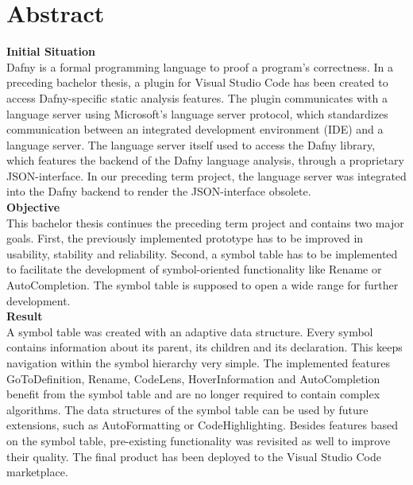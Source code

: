 \section{Abstract}
\label{section:abstract}

\textbf{Initial Situation}\\
Dafny is a formal programming language to proof a program's correctness.
In a preceding bachelor thesis, a plugin for Visual Studio Code has been created to access Dafny-specific static analysis features.
The plugin communicates with a language server using Microsoft's language server protocol, which standardizes communication between an integrated development environment (IDE) and a language server.
The language server itself used to access the Dafny library, which features the backend of the Dafny language analysis, through a proprietary JSON-interface.
In our preceding term project, the language server was integrated into the Dafny backend to render the JSON-interface obsolete.\\

\textbf{Objective}\\
This bachelor thesis continues the preceding term project and contains two major goals.
First, the previously implemented prototype has to be improved in usability, stability and reliability.
Second, a symbol table has to be implemented to facilitate the development
of symbol-oriented functionality like Rename or AutoCompletion.
The symbol table is supposed to open a wide range for further development.\\

\textbf{Result}\\
A symbol table was created with an adaptive data structure.
Every symbol contains information about its parent, its children and its declaration.
This keeps navigation within the symbol hierarchy very simple.
The implemented features GoToDefinition, Rename, CodeLens, HoverInformation and AutoCompletion benefit from the symbol table and are no longer required to contain complex algorithms.
The data structures of the symbol table can be used by future extensions, such as AutoFormatting or CodeHighlighting.
Besides features based on the symbol table, pre-existing functionality was revisited as well to improve their quality.
The final product has been deployed to the Visual Studio Code marketplace.